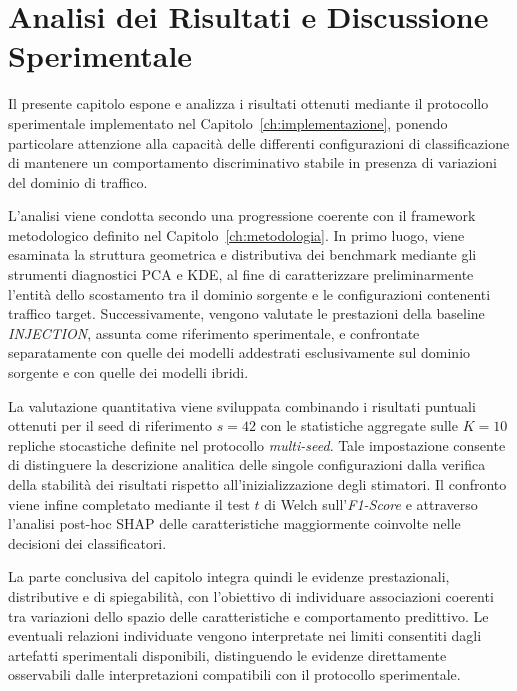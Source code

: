 \chapter{Analisi dei Risultati e Discussione Sperimentale}
\label{ch:risultati}

Il presente capitolo espone e analizza i risultati ottenuti mediante il protocollo sperimentale implementato nel Capitolo~\ref{ch:implementazione}, ponendo particolare attenzione alla capacità delle differenti configurazioni di classificazione di mantenere un comportamento discriminativo stabile in presenza di variazioni del dominio di traffico.

L'analisi viene condotta secondo una progressione coerente con il framework metodologico definito nel Capitolo~\ref{ch:metodologia}. 
In primo luogo, viene esaminata la struttura geometrica e distributiva dei benchmark mediante gli strumenti diagnostici PCA e KDE, al fine di caratterizzare preliminarmente l'entità dello scostamento tra il dominio sorgente e le configurazioni contenenti traffico target. 
Successivamente, vengono valutate le prestazioni della baseline \textit{INJECTION}, assunta come riferimento sperimentale, e confrontate separatamente con quelle dei modelli addestrati esclusivamente sul dominio sorgente e con quelle dei modelli ibridi.

La valutazione quantitativa viene sviluppata combinando i risultati puntuali ottenuti per il seed di riferimento $s=42$ con le statistiche aggregate sulle $K=10$ repliche stocastiche definite nel protocollo \textit{multi-seed}. 
Tale impostazione consente di distinguere la descrizione analitica delle singole configurazioni dalla verifica della stabilità dei risultati rispetto all'inizializzazione degli stimatori. 
Il confronto viene infine completato mediante il test $t$ di Welch sull'\textit{F1-Score} e attraverso l'analisi post-hoc SHAP delle caratteristiche maggiormente coinvolte nelle decisioni dei classificatori.

La parte conclusiva del capitolo integra quindi le evidenze prestazionali, distributive e di spiegabilità, con l'obiettivo di individuare associazioni coerenti tra variazioni dello spazio delle caratteristiche e comportamento predittivo. 
Le eventuali relazioni individuate vengono interpretate nei limiti consentiti dagli artefatti sperimentali disponibili, distinguendo le evidenze direttamente osservabili dalle interpretazioni compatibili con il protocollo sperimentale.


